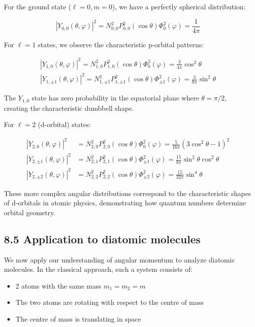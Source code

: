 \documentclass[10pt]{article}
\begin{document}
For the ground state ($\ell=0, m=0$), we have a perfectly spherical distribution:

\begin{equation*}
\left|Y_{0,0}(\theta, \varphi)\right|^{2}=N_{0,0}^{2} P_{0,0}^{2}(\cos \theta) \Phi_{0}^{2}(\varphi)=\frac{1}{4 \pi} \tag{8.60}
\end{equation*}

For $\ell=1$ states, we observe the characteristic p-orbital patterns:

\[
\begin{array}{r}
\left|Y_{1,0}(\theta, \varphi)\right|^{2}=N_{1,0}^{2} P_{1,0}^{2}(\cos \theta) \Phi_{0}^{2}(\varphi)=\frac{3}{4 \pi} \cos ^{2} \theta \\
\left|Y_{1, \pm 1}(\theta, \varphi)\right|^{2}=N_{1, \pm 1}^{2} P_{1, \pm 1}^{2}(\cos \theta) \Phi_{ \pm 1}^{2}(\varphi)=\frac{3}{8 \pi} \sin ^{2} \theta \tag{8.61}
\end{array}
\]

The $Y_{1,0}$ state has zero probability in the equatorial plane where $\theta=\pi/2$, creating the characteristic dumbbell shape.

For $\ell=2$ (d-orbital) states:

\begin{align*}
\left|Y_{2,0}(\theta, \varphi)\right|^{2} & =N_{2,0}^{2} P_{2,0}^{2}(\cos \theta) \Phi_{0}^{2}(\varphi)=\frac{5}{16 \pi}\left(3 \cos ^{2} \theta-1\right)^{2} \\
\left|Y_{2, \pm 1}(\theta, \varphi)\right|^{2} & =N_{2,1}^{2} P_{2,1}^{2}(\cos \theta) \Phi_{ \pm 1}^{2}(\varphi)=\frac{15}{8 \pi} \sin ^{2} \theta \cos ^{2} \theta  \tag{8.62}\\
\left|Y_{2, \pm 2}(\theta, \varphi)\right|^{2} & =N_{2,2}^{2} P_{2,2}^{2}(\cos \theta) \Phi_{ \pm 2}^{2}(\varphi)=\frac{15}{32 \pi} \sin ^{4} \theta
\end{align*}

These more complex angular distributions correspond to the characteristic shapes of d-orbitals in atomic physics, demonstrating how quantum numbers determine orbital geometry.

\subsection*{8.5 Application to diatomic molecules}
We now apply our understanding of angular momentum to analyze diatomic molecules. In the classical approach, such a system consists of:

\begin{itemize}
  \item 2 atoms with the same mass $m_{1}=m_{2}=m$
  \item The two atoms are rotating with respect to the centre of mass
  \item The centre of mass is translating in space
\end{itemize}
\end{document}
